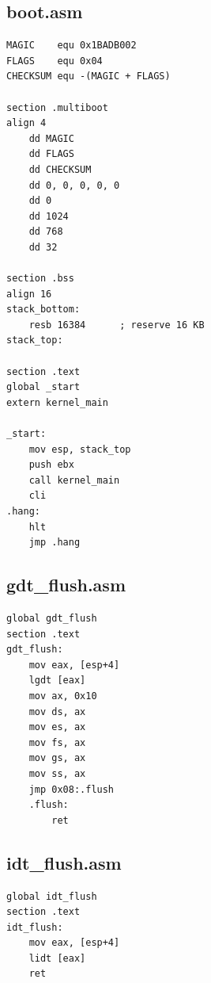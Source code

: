 \documentclass[12pt,a4paper]{report}
\begin{document}
\subsection{boot.asm}
\begin{lstlisting}[language={[x86masm]Assembler}]
MAGIC    equ 0x1BADB002
FLAGS    equ 0x04
CHECKSUM equ -(MAGIC + FLAGS)

section .multiboot
align 4
    dd MAGIC
    dd FLAGS
    dd CHECKSUM
    dd 0, 0, 0, 0, 0
    dd 0
    dd 1024
    dd 768
    dd 32

section .bss
align 16
stack_bottom:
    resb 16384      ; reserve 16 KB
stack_top:

section .text
global _start
extern kernel_main

_start:
    mov esp, stack_top
    push ebx
    call kernel_main
    cli
.hang:
    hlt
    jmp .hang

\end{lstlisting}

\subsection{gdt\_flush.asm}
\begin{lstlisting}[language={[x86masm]Assembler}]
global gdt_flush
section .text
gdt_flush:
    mov eax, [esp+4]
    lgdt [eax]
    mov ax, 0x10
    mov ds, ax
    mov es, ax
    mov fs, ax
    mov gs, ax
    mov ss, ax
    jmp 0x08:.flush
    .flush:
        ret
\end{lstlisting}

\subsection{idt\_flush.asm}
\begin{lstlisting}[language={[x86masm]Assembler}]
global idt_flush
section .text
idt_flush:
    mov eax, [esp+4]
    lidt [eax]
    ret
\end{lstlisting}
\end{document}
